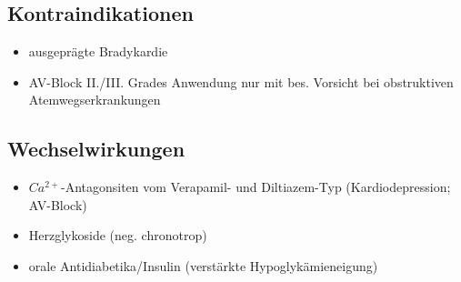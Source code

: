 \documentclass[10pt,a4paper]{report}
\begin{document}
\subsection{Kontraindikationen}
\begin{itemize}
	\item ausgeprägte Bradykardie
	\item AV-Block II./III. Grades Anwendung nur mit bes. Vorsicht bei obstruktiven Atemwegserkrankungen
\end{itemize}
\subsection{Wechselwirkungen}
\begin{itemize}
	\item $Ca^{2+}$-Antagonsiten vom Verapamil- und Diltiazem-Typ (Kardiodepression; AV-Block)
	\item Herzglykoside (neg. chronotrop)
	\item orale Antidiabetika/Insulin (verstärkte Hypoglykämieneigung)
\end{itemize}
\end{document}
